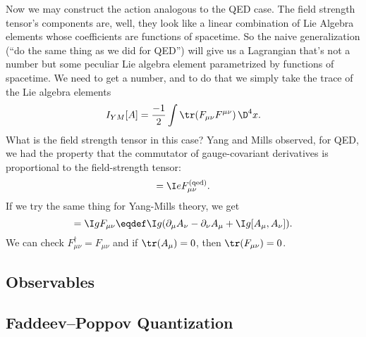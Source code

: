 Now we may construct the action analogous to the QED case. The field
strength tensor's components are, well, they look like a linear
combination of Lie Algebra elements whose coefficients are functions of
spacetime. So the naive generalization (``do the same thing as we did for QED'')
will give us a Lagrangian that's not a number but some peculiar Lie
algebra element parametrized by functions of spacetime. We need to get a
number, and to do that we simply take the trace of the Lie algebra
elements
\begin{equation}
  \action_{YM}[A] = \frac{-1}{2}\int\tr(F_{\mu\nu}F^{\mu\nu})\,\D^{4}x.
\end{equation}
What is the field strength tensor in this case? Yang and Mills observed,
for QED, we had the property that the commutator of gauge-covariant
derivatives is proportional to the field-strength tensor:
\begin{equation}
  [\gaugeDerivative_{\mu}, \gaugeDerivative_{\nu}]
  = \I\elementarycharge F^{(\text{qed})}_{\mu\nu}.
\end{equation}
If we try the same thing for Yang-Mills theory, we get
\begin{equation}
  [\gaugeDerivative_{\mu}, \gaugeDerivative_{\nu}]
  = \I g F_{\mu\nu}\eqdef \I g(\partial_{\mu}A_{\nu}
  -\partial_{\nu}A_{\mu} + \I g[A_{\mu}, A_{\nu}]).
\end{equation}
We can check $F^{\dagger}_{\mu\nu} = F_{\mu\nu}$ and if
$\tr(A_{\mu})=0$, then $\tr(F_{\mu\nu})=0$.

\subsection{Observables}

\subsection{Faddeev--Poppov Quantization}
